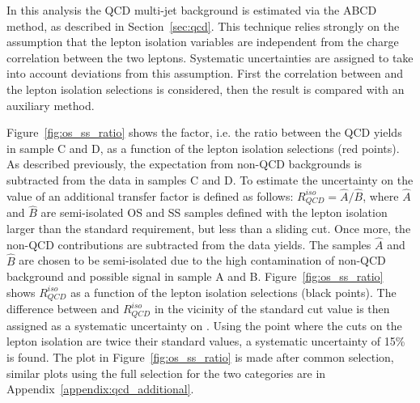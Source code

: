 In this analysis the QCD multi-jet background is estimated via the ABCD method, as
described in Section~\ref{sec:qcd}. This technique relies strongly on
the assumption that the lepton isolation variables are independent from the
charge correlation between the two leptons. Systematic uncertainties
are assigned to take into account deviations from this assumption.
First the correlation between \rqcd and the lepton isolation selections is considered,
then the result is compared with an auxiliary method. 

Figure~\ref{fig:os_ss_ratio} shows the \rqcd factor, i.e. the ratio between the QCD 
yields in sample C and D, as a function of the lepton isolation selections (red points).
As described previously, the expectation from non-QCD backgrounds is subtracted from the data in samples C and D.
To estimate the uncertainty on the value of \rqcd  an additional transfer factor is defined as follows: $R_{QCD}^{iso}  = \hat{A} / \hat{B}$,
where  $\hat{A}$ and $\hat{B}$  are semi-isolated OS and SS samples defined with the lepton isolation larger than the standard requirement, 
but less than a sliding cut. Once more, the non-QCD contributions are subtracted from the data yields.
The samples $\hat{A}$ and $\hat{B}$ are chosen to be semi-isolated 
due to the high contamination of non-QCD background and possible signal in sample A and B. 
Figure~\ref{fig:os_ss_ratio} shows $R_{QCD}^{iso}$ as a function of the lepton isolation selections (black points).
The difference between \rqcd and $R_{QCD}^{iso} $ in the vicinity of the standard cut value is then assigned as a systematic uncertainty on \rqcd. Using the point where the cuts on the lepton isolation are twice their standard values, a systematic uncertainty of 15\% is found.
The plot in Figure~\ref{fig:os_ss_ratio} is made after common selection, similar plots using the full selection
for the two categories are in Appendix~\ref{appendix:qcd_additional}.


